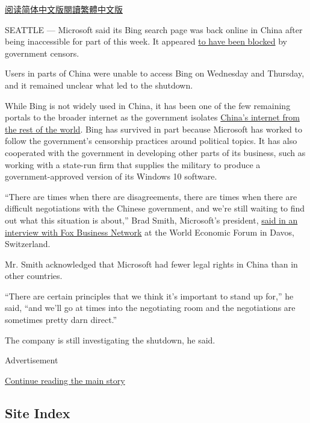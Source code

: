 \href{https://cn.nytimes3xbfgragh.onion/technology/20190125/microsoft-bing-china/}{阅读简体中文版}\href{https://cn.nytimes3xbfgragh.onion/technology/20190125/microsoft-bing-china/zh-hant/}{閱讀繁體中文版}

SEATTLE --- Microsoft said its Bing search page was back online in China
after being inaccessible for part of this week. It appeared
\href{https://www.nytimes3xbfgragh.onion/2019/01/23/business/china-microsoft-bing.html}{to
have been blocked} by government censors.

Users in parts of China were unable to access Bing on Wednesday and
Thursday, and it remained unclear what led to the shutdown.

While Bing is not widely used in China, it has been one of the few
remaining portals to the broader internet as the government isolates
\href{https://www.nytimes3xbfgragh.onion/2018/08/06/technology/china-generation-blocked-internet.html?module=inline}{China's
internet from the rest of the world}. Bing has survived in part because
Microsoft has worked to follow the government's censorship practices
around political topics. It has also cooperated with the government in
developing other parts of its business, such as working with a state-run
firm that supplies the military to produce a government-approved version
of its Windows 10 software.

``There are times when there are disagreements, there are times when
there are difficult negotiations with the Chinese government, and we're
still waiting to find out what this situation is about,'' Brad Smith,
Microsoft's president,
\href{https://video.foxbusiness.com/v/5993355739001/\#sp=show-clips}{said
in an interview with Fox Business Network} at the World Economic Forum
in Davos, Switzerland.

Mr. Smith acknowledged that Microsoft had fewer legal rights in China
than in other countries.

``There are certain principles that we think it's important to stand up
for,'' he said, ``and we'll go at times into the negotiating room and
the negotiations are sometimes pretty darn direct.''

The company is still investigating the shutdown, he said.

Advertisement

\protect\hyperlink{after-bottom}{Continue reading the main story}

\hypertarget{site-index}{%
\subsection{Site Index}\label{site-index}}

